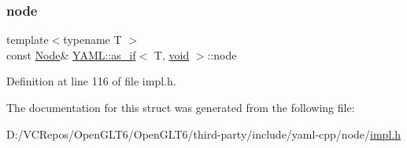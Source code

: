 \subsubsection{\texorpdfstring{node}{node}}
{\footnotesize\ttfamily template$<$typename T $>$ \\
const \mbox{\hyperlink{class_y_a_m_l_1_1_node}{Node}}\& \mbox{\hyperlink{struct_y_a_m_l_1_1as__if}{Y\+A\+M\+L\+::as\+\_\+if}}$<$ T, \mbox{\hyperlink{glad_8h_a950fc91edb4504f62f1c577bf4727c29}{void}} $>$\+::node}



Definition at line 116 of file impl.\+h.



The documentation for this struct was generated from the following file\+:\begin{DoxyCompactItemize}
\item 
D\+:/\+V\+C\+Repos/\+Open\+G\+L\+T6/\+Open\+G\+L\+T6/third-\/party/include/yaml-\/cpp/node/\mbox{\hyperlink{impl_8h}{impl.\+h}}\end{DoxyCompactItemize}
